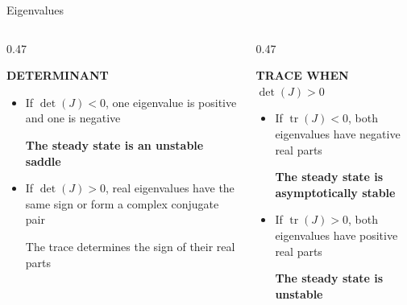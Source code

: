 \begin{frame}{Eigenvalues}
\vspace{-0.34cm}

\begin{columns}[t,onlytextwidth]

  \begin{column}{0.47\textwidth}

    {\color{HydraGold}\bfseries\fontsize{8.4}{10}\selectfont
      DETERMINANT
    \par}

    \vspace{0.10cm}

    {\color{HydraBody}\fontsize{7.8}{9.7}\selectfont
    \begin{itemize}
      \setlength{\itemsep}{0.20cm}

      \item
        If $\det(J)<0$, one eigenvalue is positive and one is negative

        \textcolor{HydraRed}{\bfseries The steady state is an unstable saddle}

      \item
        If $\det(J)>0$, real eigenvalues have the same sign or form a complex conjugate pair

        \textcolor{HydraMuted}{The trace determines the sign of their real parts}

    \end{itemize}
    }

  \end{column}

  \begin{column}{0.47\textwidth}

    {\color{HydraGold}\bfseries\fontsize{8.4}{10}\selectfont
      TRACE WHEN $\det(J)>0$
    \par}

    \vspace{0.10cm}

    {\color{HydraBody}\fontsize{7.8}{9.7}\selectfont
    \begin{itemize}
      \setlength{\itemsep}{0.20cm}

      \item
        If $\operatorname{tr}(J)<0$, both eigenvalues have negative real parts

        \textcolor{HydraCyan}{\bfseries The steady state is asymptotically stable}

      \item
        If $\operatorname{tr}(J)>0$, both eigenvalues have positive real parts

        \textcolor{HydraRed}{\bfseries The steady state is unstable}

    \end{itemize}
    }

  \end{column}

\end{columns}

\vspace{0.10cm}

\end{frame}


